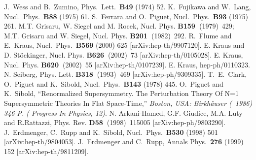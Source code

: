 \documentclass[a4paper,12pt]{article}
\begin{document}
\def\npb#1#2#3{{Nucl. Phys. }{\bf B#1\ }(19#2)\ #3}
\def\npbr#1#2#3{{Nucl. Phys. }{\bf B#1\ }(20#2)\ #3}
\def\prd#1#2#3{{Phys. Rev. }{\bf D#1~}(19#2)~#3}
\def\plb#1#2#3{{Phys. Lett. }{\bf B#1~}(19#2)~#3}
\begin{thebibliography}{99}
J.~Wess and B.~Zumino,
Phys.\ Lett.\  {\bf B49} (1974) 52.
K.~Fujikawa and W.~Lang,
Nucl.\ Phys.\  {\bf B88} (1975) 61.
S.~Ferrara and O.~Piguet,
Nucl.\ Phys.\  {\bf B93} (1975) 261.
   M.T. Grisaru, W. Siegel   and M. Rocek,
\npb{159}{79}{429};\\
M.T. Grisaru  and W. Siegel, \npb{201}{82}292.
R.~Flume and E.~Kraus,
Nucl.\ Phys.\  {\bf B569} (2000) 625
[arXiv:hep-th/9907120].
 E. Kraus and D. St\"ockinger, \npbr{626}{02}{73}
[arXiv:hep-th/0105028]. 
 E. Kraus, {Nucl. Phys. }{\bf
B620~}(2002)~55 [arXiv:hep-th/0107239].
 E. Kraus, hep-ph/0110323.
 N. Seiberg, \plb{318}{93}{469} [arXiv:hep-ph/9309335].
T.~E.~Clark, O.~Piguet and K.~Sibold,
Nucl.\ Phys.\  {\bf B143} (1978) 445.
O.~Piguet and K.~Sibold,
``Renormalized Supersymmetry. The Perturbation Theory Of N=1 Supersymmetric Theories In Flat Space-Time,''
{\it  Boston, USA: Birkh{\"a}user (~1986) 346 P. ( Progress In Physics, 12)}.
 N. Arkani-Hamed, G.F. Giudice, M.A. Luty and R.Rattazzi,
\prd{58}{98}{115005} [arXiv:hep-ph/9803290].
J.~Erdmenger, C.~Rupp and K.~Sibold,
Nucl.\ Phys.\  {\bf B530} (1998) 501
[arXiv:hep-th/9804053].
J.~Erdmenger and C.~Rupp,
Annals Phys.\  {\bf 276} (1999) 152
[arXiv:hep-th/9811209].
\end{thebibliography}
\end{document}
